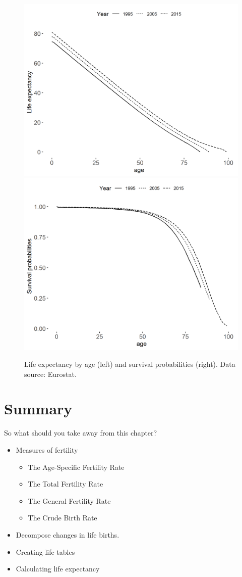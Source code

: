\documentclass[]{book}
\providecommand{\tightlist}{%
  \setlength{\itemsep}{0pt}\setlength{\parskip}{0pt}}
\begin{document}
\begin{figure}

{\centering \includegraphics[width=0.5\linewidth]{_resources/chapter_death/fig11} \includegraphics[width=0.5\linewidth]{_resources/chapter_death/fig12} 

}

\caption{Life expectancy by age (left) and survival probabilities (right). Data source: Eurostat. }\label{fig:death2}
\end{figure}

\hypertarget{summary-2}{%
\section{Summary}\label{summary-2}}

So what should you take away from this chapter?

\begin{itemize}
\tightlist
\item
  Measures of fertility

  \begin{itemize}
  \tightlist
  \item
    The Age-Specific Fertility Rate
  \item
    The Total Fertility Rate
  \item
    The General Fertility Rate
  \item
    The Crude Birth Rate
  \end{itemize}
\item
  Decompose changes in life births.
\item
  Creating life tables
\item
  Calculating life expectancy
\end{itemize}
\end{document}
